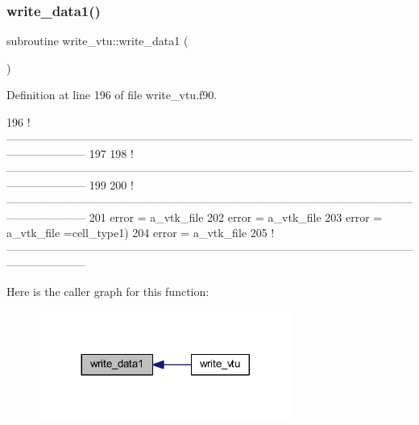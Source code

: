 \subsubsection{\texorpdfstring{write\+\_\+data1()}{write\_data1()}}
{\footnotesize\ttfamily subroutine write\+\_\+vtu\+::write\+\_\+data1 (\begin{DoxyParamCaption}{ }\end{DoxyParamCaption})}



Definition at line 196 of file write\+\_\+vtu.\+f90.


\begin{DoxyCode}
196   \textcolor{comment}{
      !---------------------------------------------------------------------------------------------------------------------------------}
197   
198   \textcolor{comment}{
      !---------------------------------------------------------------------------------------------------------------------------------}
199 
200   \textcolor{comment}{
      !---------------------------------------------------------------------------------------------------------------------------------}
201   error = a\_vtk\_file%
202   error = a\_vtk\_file%
203   error = a\_vtk\_file%
      =cell\_type1)
204   error = a\_vtk\_file%
205   \textcolor{comment}{
      !---------------------------------------------------------------------------------------------------------------------------------}
\end{DoxyCode}
Here is the caller graph for this function\+:
\nopagebreak
\begin{figure}[H]
\begin{center}
\leavevmode
\includegraphics[width=236pt]{write__vtu_8f90_ae39ce165900c97fc318d09bf9670ac92_icgraph}
\end{center}
\end{figure}
\mbox{\label{write__vtu_8f90_ad806107886f0521aac56740b4a2aaf62}} 
